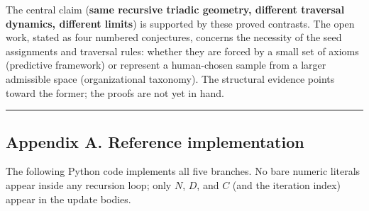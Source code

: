 \documentclass[
  11pt,
  letterpaper,
]{article}
\begin{document}
The central claim (\textbf{same recursive triadic geometry, different
traversal dynamics, different limits}) is supported by these proved
contrasts. The open work, stated as four numbered conjectures, concerns
the necessity of the seed assignments and traversal rules: whether they
are forced by a small set of axioms (predictive framework) or represent
a human-chosen sample from a larger admissible space (organizational
taxonomy). The structural evidence points toward the former; the proofs
are not yet in hand.

\begin{center}\rule{0.5\linewidth}{0.5pt}\end{center}

\subsection{Appendix A. Reference
implementation}\label{appendix-a.-reference-implementation}

The following Python code implements all five branches. No bare numeric
literals appear inside any recursion loop; only \(N\), \(D\), and \(C\)
(and the iteration index) appear in the update bodies.
\end{document}
